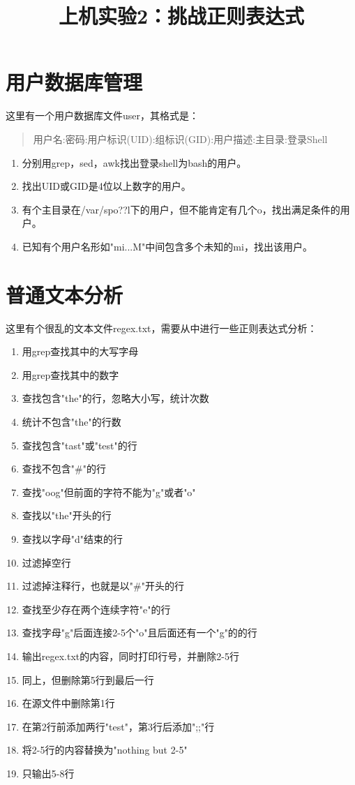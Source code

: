\documentclass[12pt]{article}
\begin{document}
\begin{CJK*}{UTF8}{gbsn}

\title{上机实验2：挑战正则表达式}
\author{}
\date{}

\maketitle

\section{用户数据库管理}

这里有一个用户数据库文件user，其格式是：
\begin{quote}
用户名:密码:用户标识(UID):组标识(GID):用户描述:主目录:登录Shell
\end{quote}

\begin{enumerate}[(1)]
	\item 分别用grep，sed，awk找出登录shell为bash的用户。
	\item 找出UID或GID是4位以上数字的用户。
	\item 有个主目录在/var/spo??l下的用户，但不能肯定有几个o，找出满足条件的用户。
	\item 已知有个用户名形如"mi...M"中间包含多个未知的mi，找出该用户。
\end{enumerate}

\section{普通文本分析}

这里有个很乱的文本文件regex.txt，需要从中进行一些正则表达式分析：
\begin{enumerate}[(1)]
	\item 用grep查找其中的大写字母
	\item 用grep查找其中的数字
	\item 查找包含"the"的行，忽略大小写，统计次数
	\item 统计不包含"the"的行数
	\item 查找包含"tast"或"test"的行
	\item 查找不包含"\#"的行
	\item 查找"oog"但前面的字符不能为"g"或者"o"
	\item 查找以"the"开头的行
	\item 查找以字母"d"结束的行
	\item 过滤掉空行
	\item 过滤掉注释行，也就是以"\#"开头的行
	\item 查找至少存在两个连续字符"e"的行
	\item 查找字母"g"后面连接2-5个"o"且后面还有一个"g"的的行
	\item 输出regex.txt的内容，同时打印行号，并删除2-5行
	\item 同上，但删除第5行到最后一行
	\item 在源文件中删除第1行
	\item 在第2行前添加两行"test"，第3行后添加";;"行
	\item 将2-5行的内容替换为"nothing but 2-5"
	\item 只输出5-8行
\end{enumerate}


\end{CJK*}
\end{document}
